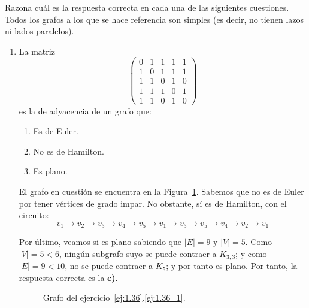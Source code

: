 \begin{ejercicio}\label{ej:1.36}
    Razona cuál es la respuesta correcta en cada una de las siguientes cuestiones. Todos los grafos a los que se hace referencia son simples (es decir, no tienen lazos ni lados paralelos).
    \begin{enumerate}
        \item\label{ej:1.36_1}
        La matriz
        \[
            \begin{pmatrix}
                0 & 1 & 1 & 1 & 1 \\
                1 & 0 & 1 & 1 & 1 \\
                1 & 1 & 0 & 1 & 0 \\
                1 & 1 & 1 & 0 & 1 \\
                1 & 1 & 0 & 1 & 0
            \end{pmatrix}
        \]
        es la de adyacencia de un grafo que:
        \begin{enumerate}
            \item Es de Euler.
            \item No es de Hamilton.
            \item Es plano.
        \end{enumerate}

        El grafo en cuestión se encuentra en la Figura~\ref{fig:1.36_1}. Sabemos que no es de Euler por tener vértices de grado impar. No obstante, sí es de Hamilton, con el circuito:
        \begin{equation*}
            v_1\to v_2\to v_3\to v_4\to v_5\to v_1\to v_3\to v_5\to v_4\to v_2\to v_1
        \end{equation*}

        Por último, veamos si es plano sabiendo que $|E|=9$ y $|V|=5$. Como $|V|=5<6$, ningún subgrafo suyo se puede contraer a $K_{3,3}$; y como $|E|=9<10$, no se puede contraer a $K_5$; y por tanto es plano. Por tanto, la respuesta correcta es la \textbf{c)}.
        \begin{figure}
            \centering
            \caption{Grafo del ejercicio~\ref{ej:1.36}.\ref{ej:1.36_1}.}
            \label{fig:1.36_1}
        \end{figure}



\end{enumerate}
\end{ejercicio}
